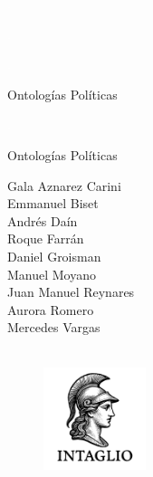 \newpage
\thispagestyle{empty}
{\textcolor{white}{.}}

\newpage
\thispagestyle{empty}
{\textcolor{white}{.}}

\newpage
\thispagestyle{empty}
{\textcolor{white}{.}}

\vspace{30mm}

\begin{center}
	\LARGE{Ontologías Políticas}
\end{center}

\newpage
\thispagestyle{empty}
{\textcolor{white}{.}}

\newpage
\thispagestyle{empty}

\vspace{30mm}

\begin{center}
	\LARGE{Ontologías Políticas}\\\vspace{10mm}

	\Large{}
\end{center}

\vspace{10mm}

\begin{center}%
{\sc\large{Gala Aznarez Carini\\
		Emmanuel Biset\\
		Andrés Daín\\
		Roque Farrán\\
		Daniel Groisman\\
		Manuel Moyano\\
		Juan Manuel Reynares\\
		Aurora Romero\\
		Mercedes Vargas\\}}\\ %
\end{center}




\vfill

\begin{figure}[b]
\centering
\includegraphics[width=30mm]{./media/logo-imago-ByW.png}
\end{figure}


